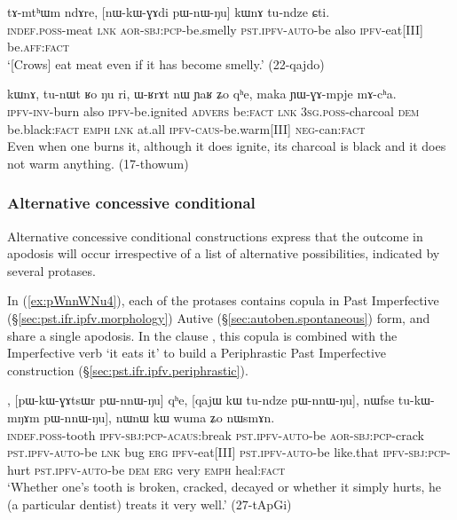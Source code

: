 \begin{exe}
\ex \label{ex:nWkWGAdi.kWnA}
 \gll tɤ-mtʰɯm ndɤre, [nɯ-kɯ-ɣɤdi pɯ-nɯ-ŋu] kɯnɤ tu-ndze ɕti. \\
 \textsc{indef}.\textsc{poss}-meat \textsc{lnk} \textsc{aor}-\textsc{sbj}:\textsc{pcp}-be.smelly \textsc{pst}.\textsc{ipfv}-\textsc{auto}-be also \textsc{ipfv}-eat[III] be.\textsc{aff}:\textsc{fact} \\
\glt `[Crows] eat meat even if it has become smelly.' (22-qajdo)
 \end{exe}
 
\begin{exe}
\ex \label{ex:chWwGnWBlW.kWnA}
  kɯnɤ, tu-nɯt ʁo ŋu ri, ɯ-ʁrɤt nɯ ɲaʁ ʑo qʰe, maka ɲɯ-ɣɤ-mpje mɤ-cʰa. \\
  \textsc{ipfv}-\textsc{inv}-burn also \textsc{ipfv}-be.ignited \textsc{advers} be:\textsc{fact} \textsc{lnk}
\textsc{3sg}.\textsc{poss}-charcoal \textsc{dem}  be.black:\textsc{fact} \textsc{emph} \textsc{lnk} at.all \textsc{ipfv}-\textsc{caus}-be.warm[III] \textsc{neg}-can:\textsc{fact} \\
 \glt Even when one burns it, although it does ignite, its charcoal is black and it does not warm anything. (17-thowum)
\end{exe}
 
 \subsubsection{Alternative concessive conditional} \label{sec:alt.concessive.conditional}
Alternative concessive conditional constructions express that the outcome in apodosis will occur irrespective of a list of alternative possibilities, indicated by several protases. 


In (\ref{ex:pWnnWNu4}), each of the protases contains copula  in Past Imperfective (§\ref{sec:pst.ifr.ipfv.morphology}) Autive (§\ref{sec:autoben.spontaneous}) form, and share a single apodosis. In the clause , this copula is combined with the Imperfective verb  `it eats it' to build a Periphrastic Past Imperfective construction (§\ref{sec:pst.ifr.ipfv.periphrastic}).
\largerpage
\begin{exe}
\ex  \label{ex:pWnnWNu4}
, [pɯ-kɯ-ɣɤtsɯr pɯ-nnɯ-ŋu] qʰe, [qajɯ kɯ tu-ndze pɯ-nnɯ-ŋu], nɯfse tu-kɯ-mŋɤm pɯ-nnɯ-ŋu], nɯnɯ kɯ wuma ʑo nɯsmɤn. \\
\textsc{indef}.\textsc{poss}-tooth \textsc{ipfv}-\textsc{sbj}:\textsc{pcp}-\textsc{acaus}:break \textsc{pst}.\textsc{ipfv}-\textsc{auto}-be
\textsc{aor}-\textsc{sbj}:\textsc{pcp}-crack \textsc{pst}.\textsc{ipfv}-\textsc{auto}-be \textsc{lnk}
bug \textsc{erg} \textsc{ipfv}-eat[III] \textsc{pst}.\textsc{ipfv}-\textsc{auto}-be 
like.that \textsc{ipfv}-\textsc{sbj}:\textsc{pcp}-hurt \textsc{pst}.\textsc{ipfv}-\textsc{auto}-be
\textsc{dem} \textsc{erg} very \textsc{emph} heal:\textsc{fact} \\
\glt `Whether one's tooth is broken, cracked, decayed or whether it simply hurts, he (a particular dentist) treats it very well.' (27-tApGi)
\end{exe}

